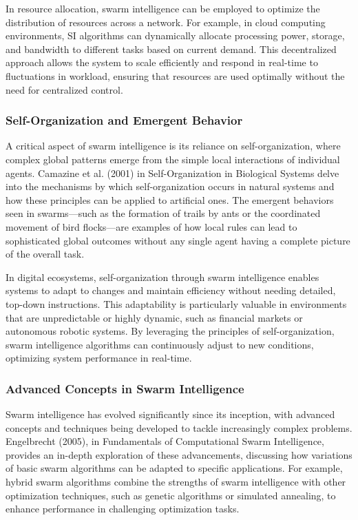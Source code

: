 \documentclass[12pt,twoside]{article}
\begin{document}
In resource allocation, swarm intelligence can be employed to optimize the distribution of resources across a network. For example, in cloud computing environments, SI algorithms can dynamically allocate processing power, storage, and bandwidth to different tasks based on current demand. This decentralized approach allows the system to scale efficiently and respond in real-time to fluctuations in workload, ensuring that resources are used optimally without the need for centralized control.

\subsubsection{Self-Organization and Emergent Behavior}

A critical aspect of swarm intelligence is its reliance on self-organization, where complex global patterns emerge from the simple local interactions of individual agents. Camazine et al. (2001) in Self-Organization in Biological Systems delve into the mechanisms by which self-organization occurs in natural systems and how these principles can be applied to artificial ones. The emergent behaviors seen in swarms—such as the formation of trails by ants or the coordinated movement of bird flocks—are examples of how local rules can lead to sophisticated global outcomes without any single agent having a complete picture of the overall task.

In digital ecosystems, self-organization through swarm intelligence enables systems to adapt to changes and maintain efficiency without needing detailed, top-down instructions. This adaptability is particularly valuable in environments that are unpredictable or highly dynamic, such as financial markets or autonomous robotic systems. By leveraging the principles of self-organization, swarm intelligence algorithms can continuously adjust to new conditions, optimizing system performance in real-time.

\subsubsection{Advanced Concepts in Swarm Intelligence}

Swarm intelligence has evolved significantly since its inception, with advanced concepts and techniques being developed to tackle increasingly complex problems. Engelbrecht (2005), in Fundamentals of Computational Swarm Intelligence, provides an in-depth exploration of these advancements, discussing how variations of basic swarm algorithms can be adapted to specific applications. For example, hybrid swarm algorithms combine the strengths of swarm intelligence with other optimization techniques, such as genetic algorithms or simulated annealing, to enhance performance in challenging optimization tasks.
\end{document}
